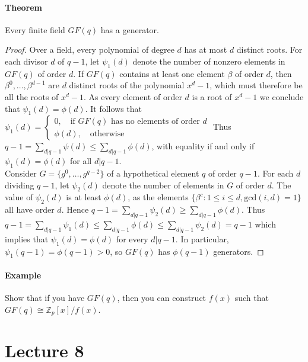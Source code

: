 \documentclass[10pt,letter]{article}
\theoremstyle{plain}
\theoremstyle{definition}
\begin{document}
\paragraph{Theorem}
Every finite field $GF(q)$ has a generator. 
\begin{proof}
     Over a field, every polynomial of degree $d$ has at most $d$ distinct roots. For each divisor $d$ of $q-1$, let $\psi_1(d)$ denote the number of nonzero elements in $GF(q)$ of order $d$. If $GF(q)$ contains at least one element $\beta$ of order $d$, then $\beta^0,\ldots,\beta^{d-1}$ are $d$ distinct roots of the polynomial $x^d-1$, which must therefore be all the roots of $x^d-1$. As every element of order $d$ is a root of $x^d-1$ we conclude that $\psi_1(d)=\phi(d)$. It follows that $\psi_1(d)=\begin{cases}0,\quad\text{if }GF(q)\text{ has no elements of order }d\\\phi(d),\quad\text{otherwise}\end{cases}$ Thus $q-1=\sum_{d|q-1}\psi(d)\leq\sum_{d|q-1}\phi(d)$, with equality if and only if $\psi_1(d)=\phi(d)$ for all $d|q-1$. \\ 
     Consider $G=\{g^0,\ldots,g^{q-2}\}$ of a hypothetical element $q$ of order $q-1$. For each $d$ dividing $q-1$, let $\psi_2(d)$ denote the number of elements in $G$ of order $d$. The value of $\psi_2(d)$ is at least $\phi(d)$, as the elements $\{\beta^c:1\leq i\leq d,\text{gcd}(i,d)=1\}$ all have order $d$. Hence $q-1=\sum_{d|q-1}\psi_2(d)\geq\sum_{d|q-1}\phi(d)$. Thus $q-1=\sum_{d|q-1}\psi_1(d)\leq\sum_{d|q-1}\phi(d)\leq\sum_{d|q-1}\psi_2(d)=q-1$ which implies that $\psi_1(d)=\phi(d)$ for every $d|q-1$. In particular, $\psi_1(q-1)=\phi(q-1)>0$, so $GF(q)$ has $\phi(q-1)$ generators.  
\end{proof}
\paragraph{Example}
Show that if you have $GF(q)$, then you can construct $f(x)$ such that $GF(q)\cong\mathbb{Z}_p[x]/f(x)$. 


\section*{Lecture 8}
\end{document}
